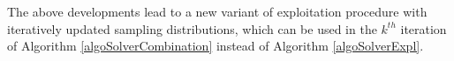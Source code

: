 The above developments lead to a new variant of exploitation procedure with iteratively updated sampling distributions, which can be used in the $k^{th}$ iteration of Algorithm \ref{algoSolverCombination} instead of Algorithm \ref{algoSolverExpl}. 

 

